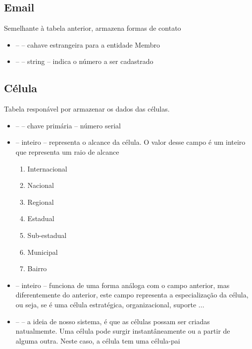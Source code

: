 \documentclass{article}
\newcommand{\codigo}[3]{}
\begin{document}
        \subsection{Email}

            Semelhante à tabela anterior, armazena formas de contato
            \codigo{44}{53}{Email}
            \begin{itemize}
                \item \key \fk --  -- cahave estrangeira para a entidade Membro
                \item \key --  -- string -- indica o número a ser cadastrado
            \end{itemize}

        \subsection{Célula}

            Tabela responável por armazenar os dados das células.
            \codigo{55}{66}{Célula}
            \begin{itemize}
                \item \pk --  --  chave primária -- número serial
                \item {} -- inteiro --  representa o alcance da célula. O valor
                desse campo é um inteiro que representa um raio de alcance \begin{enumerate}
                    \item Internacional
                    \item Nacional
                    \item Regional
                    \item Estadual
                    \item Sub-estadual
                    \item Municipal
                    \item Bairro
                \end{enumerate}
                \item {} -- inteiro -- funciona de uma forma análoga com o campo anterior,
                mas diferentemente do anterior, este campo representa a especialização da célula, ou
                seja, se é uma célula estratégica, organizacional, suporte ...
                \item \fk --  -- a ideia de nosso sistema, é que as células possam
                ser criadas natualmemte. Uma célula pode surgir instantâneamente ou a partir de
                alguma outra. Neste caso, a célula tem uma célula-pai
            \end{itemize}
\end{document}
